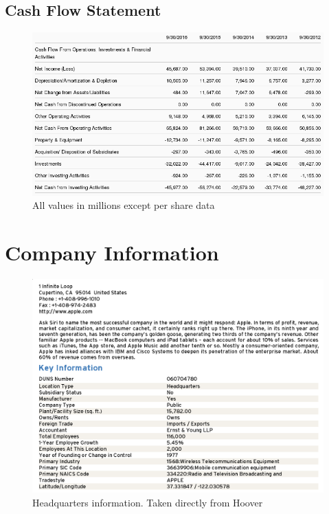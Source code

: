 \documentclass[12pt,a4paper,titlepage]{article}
\begin{document}
\subsection{Cash Flow Statement}
\begin{figure}[!htb]
  \centering
  \includegraphics[width=1\textwidth]{cash-flow}
    \caption{All values in millions except per share data~\cite{zacks-cash}}
\end{figure}

\newpage

\appendix

\section{Company Information}
\begin{figure}[!htb]
  \centering
  \includegraphics[width=1\textwidth]{overview}
    \caption{Headquarters information. Taken directly from Hoover~\cite{hoover}}
\end{figure}
\end{document}
